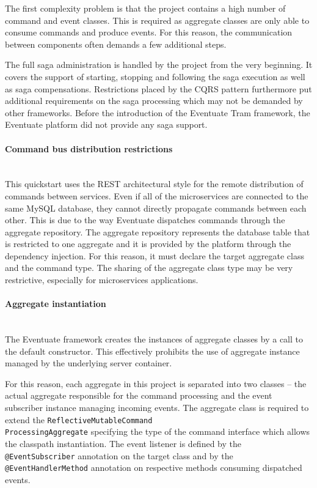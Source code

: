 \documentclass[oneside,
  digital, %
  table,   %
  lof,     %
  lot,     %
]{fithesis3}
\newcommand{\newlinepar}[1]{\paragraph{#1}\needspace{3\baselineskip}\mbox{}\\}
\begin{document}
The first complexity problem is that the project contains a high number of command and event classes. This is required as aggregate classes are only able to consume commands and produce events. For this reason,  the communication between components often demands a few additional steps.

The full saga administration is handled by the project from the very beginning. It covers the support of starting, stopping and following the saga execution as well as saga compensations. Restrictions placed by the CQRS pattern furthermore put additional requirements on the saga processing which may not be demanded by other frameworks. Before the introduction of the Eventuate Tram framework, the Eventuate platform did not provide any saga support.

\newlinepar{Command bus distribution restrictions}

This quickstart uses the REST architectural style for the remote distribution of commands between services. Even if all of the microservices are connected to the same MySQL database, they cannot directly propagate commands between each other. This is due to the way Eventuate dispatches commands through the aggregate repository. The aggregate repository represents the database table that is restricted to one aggregate and it is provided by the platform through the dependency injection. For this reason, it must declare the target aggregate class and the command type. The sharing of the aggregate class type may be very restrictive, especially for microservices applications.

\newlinepar{Aggregate instantiation}

The Eventuate framework creates the instances of aggregate classes by a call to the default constructor. This effectively prohibits the use of aggregate instance managed by the underlying server container. 

For this reason, each aggregate in this project is separated into two classes -- the actual aggregate responsible for the command processing and the event subscriber instance managing incoming events. The  aggregate class is required to extend the \texttt{ReflectiveMutableCommand\\ProcessingAggregate} specifying the type of the command interface which allows the classpath instantiation. The event listener is defined by the \texttt{@EventSubscriber} annotation on the target class and by the \texttt{@EventHandlerMethod} annotation on respective methods consuming dispatched events. 
\end{document}

